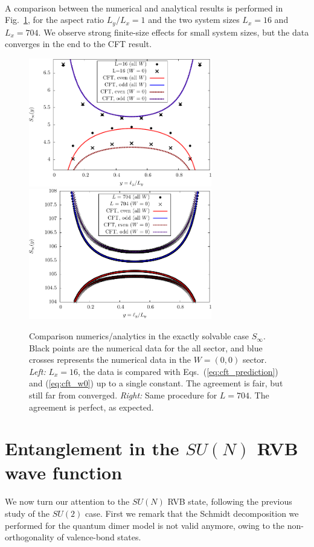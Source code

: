 \documentclass[11pt]{iopart}
\begin{document}
\paragraph{}
A comparison between the numerical and analytical results is performed in Fig.~\ref{fig:Sinfty}, for the aspect ratio $L_y/L_x=1$ and the two system sizes $L_x=16$ and $L_x=704$. We observe strong finite-size effects for small system sizes, but the data converges in the end to the CFT result.
\begin{figure}[ht]
 \begin{center}
  \includegraphics[width=8cm]{./figures/sinfty_16.pdf}
  \includegraphics[width=8cm]{./figures/sinfty_704.pdf}
 \end{center}
\caption{Comparison numerics/analytics in the exactly solvable case $S_\infty$. Black points are the numerical data for the all sector, and blue crosses represents the numerical data in the $W=(0,0)$ sector. \emph{Left:} $L_x=16$, the data is compared with Eqs.~(\ref{eq:cft_prediction}) and (\ref{eq:cft_w0}) up to a single constant. The agreement is fair, but still far from converged. \emph{Right:} Same procedure for $L=704$. The agreement is perfect, as expected. }
\label{fig:Sinfty}
\end{figure}
\section{Entanglement in the $SU(N)$ RVB wave function}
\label{sec:rvb_entanglement}\paragraph{}
We now turn our attention to the $SU(N)$ RVB state, following the previous study\cite{Ju2012} of the $SU(2)$ case. First we remark that the Schmidt decomposition we performed for the quantum dimer model is not valid anymore, owing to the non-orthogonality of valence-bond states.
\end{document}
